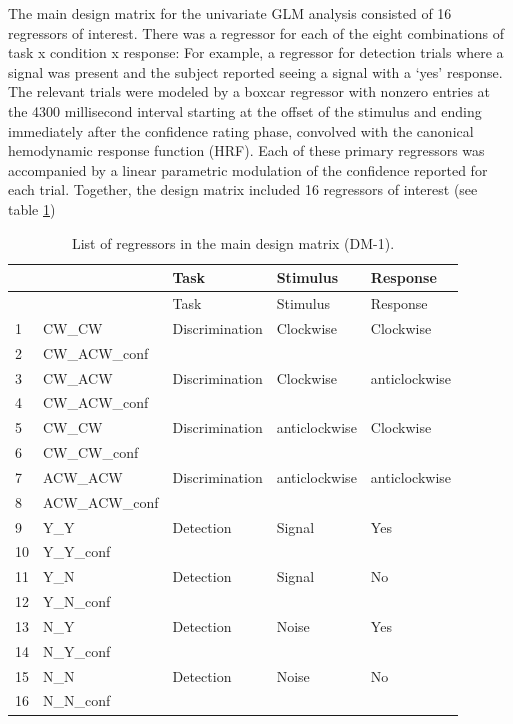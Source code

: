 \documentclass[12pt,twoside]{reedthesis}
\begin{document}
The main design matrix for the univariate GLM analysis consisted of 16 regressors of interest. There was a regressor for each of the eight combinations of task x condition x response: For example, a regressor for detection trials where a signal was present and the subject reported seeing a signal with a `yes' response. The relevant trials were modeled by a boxcar regressor with nonzero entries at the 4300 millisecond interval starting at the offset of the stimulus and ending immediately after the confidence rating phase, convolved with the canonical hemodynamic response function (HRF).
Each of these primary regressors was accompanied by a linear parametric modulation of the confidence reported for each trial. Together, the design matrix included 16 regressors of interest (see table \ref{tab:fMRIDM1})
\begin{longtable}[]{@{}lllll@{}}
\caption{\label{tab:fMRIDM1} List of regressors in the main design matrix (DM-1).}\tabularnewline
\toprule
& & Task & Stimulus & Response \\
\midrule
\endfirsthead
\toprule
& & Task & Stimulus & Response \\
\midrule
\endhead
1 & CW\_CW & Discrimination & Clockwise & Clockwise \\
2 & CW\_ACW\_conf & & & \\
3 & CW\_ACW & Discrimination & Clockwise & anticlockwise \\
4 & CW\_ACW\_conf & & & \\
5 & CW\_CW & Discrimination & anticlockwise & Clockwise \\
6 & CW\_CW\_conf & & & \\
7 & ACW\_ACW & Discrimination & anticlockwise & anticlockwise \\
8 & ACW\_ACW\_conf & & & \\
9 & Y\_Y & Detection & Signal & Yes \\
10 & Y\_Y\_conf & & & \\
11 & Y\_N & Detection & Signal & No \\
12 & Y\_N\_conf & & & \\
13 & N\_Y & Detection & Noise & Yes \\
14 & N\_Y\_conf & & & \\
15 & N\_N & Detection & Noise & No \\
16 & N\_N\_conf & & & \\
\bottomrule
\end{longtable}
\end{document}
